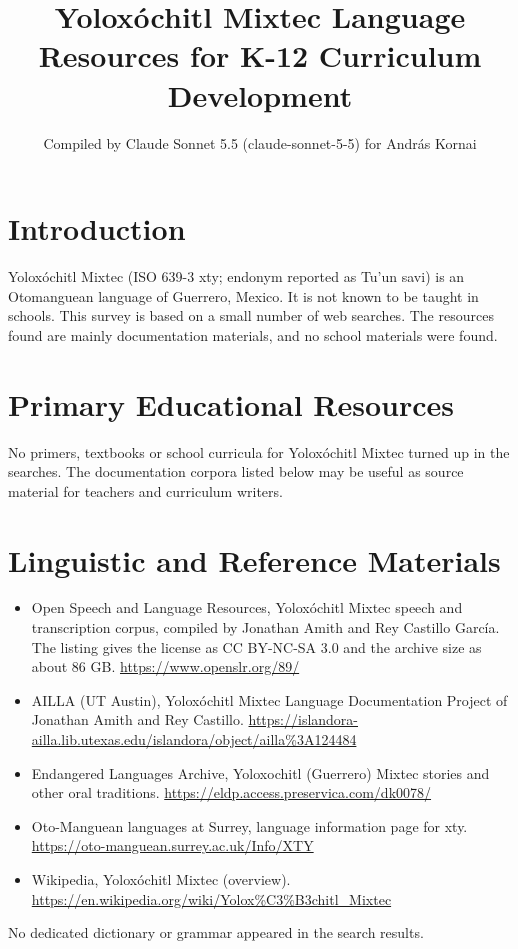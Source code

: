 \documentclass[12pt]{article}
\title{Yoloxóchitl Mixtec Language Resources for K-12 Curriculum Development}
\author{Compiled by Claude Sonnet 5.5 (claude-sonnet-5-5) for Andr\'as Kornai}
\date{}
\begin{document}
\maketitle

\section{Introduction}
Yoloxóchitl Mixtec (ISO 639-3 xty; endonym reported as Tu'un savi) is an Otomanguean language of Guerrero, Mexico. It is not known to be taught in schools. This survey is based on a small number of web searches. The resources found are mainly documentation materials, and no school materials were found.

\section{Primary Educational Resources}
No primers, textbooks or school curricula for Yoloxóchitl Mixtec turned up in the searches. The documentation corpora listed below may be useful as source material for teachers and curriculum writers.

\section{Linguistic and Reference Materials}
\begin{itemize}
\item Open Speech and Language Resources, Yoloxóchitl Mixtec speech and transcription corpus, compiled by Jonathan Amith and Rey Castillo García. The listing gives the license as CC BY-NC-SA 3.0 and the archive size as about 86 GB. \url{https://www.openslr.org/89/}
\item AILLA (UT Austin), Yoloxóchitl Mixtec Language Documentation Project of Jonathan Amith and Rey Castillo. \url{https://islandora-ailla.lib.utexas.edu/islandora/object/ailla%3A124484}
\item Endangered Languages Archive, Yoloxochitl (Guerrero) Mixtec stories and other oral traditions. \url{https://eldp.access.preservica.com/dk0078/}
\item Oto-Manguean languages at Surrey, language information page for xty. \url{https://oto-manguean.surrey.ac.uk/Info/XTY}
\item Wikipedia, Yoloxóchitl Mixtec (overview). \url{https://en.wikipedia.org/wiki/Yolox%C3%B3chitl_Mixtec}
\end{itemize}
No dedicated dictionary or grammar appeared in the search results.
\end{document}
